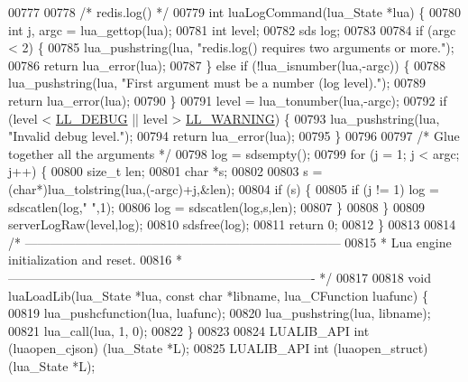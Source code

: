 \begin{DoxyCode}
{{{{{{{{00777 
00778 \textcolor{comment}{/* redis.log() */}
00779 \textcolor{keywordtype}{int} luaLogCommand(lua\_State *lua) \{
00780     \textcolor{keywordtype}{int} j, argc = lua\_gettop(lua);
00781     \textcolor{keywordtype}{int} level;
00782     sds log;
00783 
00784     \textcolor{keywordflow}{if} (argc < 2) \{
00785         lua\_pushstring(lua, \textcolor{stringliteral}{"redis.log() requires two arguments or more."});
00786         \textcolor{keywordflow}{return} lua\_error(lua);
00787     \} \textcolor{keywordflow}{else} \textcolor{keywordflow}{if} (!lua\_isnumber(lua,-argc)) \{
00788         lua\_pushstring(lua, \textcolor{stringliteral}{"First argument must be a number (log level)."});
00789         \textcolor{keywordflow}{return} lua\_error(lua);
00790     \}
00791     level = lua\_tonumber(lua,-argc);
00792     \textcolor{keywordflow}{if} (level < \hyperlink{server_8h_abcaffe365dee628fcf9fc90c69d534a1}{LL\_DEBUG} || level > \hyperlink{server_8h_a31229b9334bba7d6be2a72970967a14b}{LL\_WARNING}) \{
00793         lua\_pushstring(lua, \textcolor{stringliteral}{"Invalid debug level."});
00794         \textcolor{keywordflow}{return} lua\_error(lua);
00795     \}
00796 
00797     \textcolor{comment}{/* Glue together all the arguments */}
00798     log = sdsempty();
00799     \textcolor{keywordflow}{for} (j = 1; j < argc; j++) \{
00800         size\_t len;
00801         \textcolor{keywordtype}{char} *s;
00802 
00803         s = (\textcolor{keywordtype}{char}*)lua\_tolstring(lua,(-argc)+j,&len);
00804         \textcolor{keywordflow}{if} (s) \{
00805             \textcolor{keywordflow}{if} (j != 1) log = sdscatlen(log,\textcolor{stringliteral}{" "},1);
00806             log = sdscatlen(log,s,len);
00807         \}
00808     \}
00809     serverLogRaw(level,log);
00810     sdsfree(log);
00811     \textcolor{keywordflow}{return} 0;
00812 \}
00813 
00814 \textcolor{comment}{/* ---------------------------------------------------------------------------}
00815 \textcolor{comment}{ * Lua engine initialization and reset.}
00816 \textcolor{comment}{ * ------------------------------------------------------------------------- */}
00817 
00818 \textcolor{keywordtype}{void} luaLoadLib(lua\_State *lua, \textcolor{keyword}{const} \textcolor{keywordtype}{char} *libname, lua\_CFunction luafunc) \{
00819   lua\_pushcfunction(lua, luafunc);
00820   lua\_pushstring(lua, libname);
00821   lua\_call(lua, 1, 0);
00822 \}
00823 
00824 LUALIB\_API \textcolor{keywordtype}{int} (luaopen\_cjson) (lua\_State *L);
00825 LUALIB\_API \textcolor{keywordtype}{int} (luaopen\_struct) (lua\_State *L);
}}}}}}}}
\end{DoxyCode}
